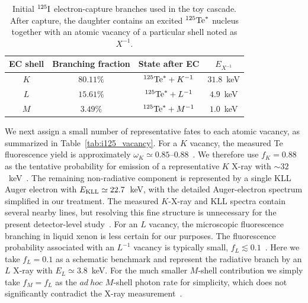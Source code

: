 \documentclass[11pt,a4paper]{article}
\begin{document}
\begin{table}[h!]
\centering
\begin{tabular}{cccc}
\hline
EC shell & Branching fraction & State after EC & $E_{X^{-1}}$\\
\hline
$K$ & $80.11\%$ & $^{125}{\rm Te}^{*}+K^{-1}$ & $31.8$~keV \\
$L$ & $15.61\%$ & $^{125}{\rm Te}^{*}+L^{-1}$ & $4.9$~keV \\
$M$ & $3.49\%$ & $^{125}{\rm Te}^{*}+M^{-1}$ & $1.0$~keV \\
\hline
\end{tabular}
\caption{Initial $^{125}{\rm I}$ electron-capture branches used in the toy cascade. After capture, the daughter contains an excited $^{125}{\rm Te}^{*}$ nucleus together with an atomic vacancy of a particular shell noted as $X^{-1}$.}
\label{tab:i125_ec}
\end{table}

We next assign a small number of representative fates to each atomic vacancy, as summarized in Table~\ref{tab:i125_vacancy}. For a $K$ vacancy, the measured Te fluorescence yield is approximately $\omega_K\simeq0.85$--$0.88$~\cite{Alotiby:2019fjj}. We therefore use $f_K=0.88$ as the tentative probability for emission of a representative $K$ X-ray with $\sim32$~keV~\cite{Bowe1952}. The remaining non-radiative component is represented by a single KLL Auger electron with $E_{\rm KLL}\simeq22.7$~keV, with the detailed Auger-electron spectrum simplified in our treatment. The measured $K$-X-ray and KLL spectra contain several nearby lines, but resolving this fine structure is unnecessary for the present detector-level study~\cite{Alotiby:2019fjj}. For an $L$ vacancy, the microscopic fluorescence branching in liquid xenon is less certain for our purposes. The fluorescence probability associated with an $L^{-1}$ vacancy is typically small, $f_L\lesssim0.1$~\cite{XrayDBXe}. Here we take $f_L=0.1$ as a schematic benchmark and represent the radiative branch by an $L$ X-ray with $E_L\simeq3.8$~keV. For the much smaller $M$-shell contribution we simply take $f_M=f_L$ as the $ad~hoc$ $M$-shell photon rate for simplicity, which does not significantly contradict the X-ray measurement~\cite{XrayDBXe}.
\end{document}
